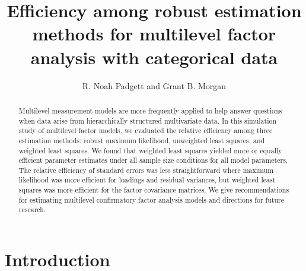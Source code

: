 \documentclass[Review,sageh,times, doublespace]{sagej}
\begin{document}

\title{Efficiency among robust estimation methods for multilevel factor analysis with categorical data}

\author{R. Noah Padgett and Grant B. Morgan}




\begin{abstract}
Multilevel measurement models are more frequently applied to help answer questions when data arise from hierarchically structured multivariate data. 
In this simulation study of multilevel factor models, we evaluated the relative efficiency among three estimation methods: robust maximum likelihood, unweighted least squares, and weighted least squares.
We found that weighted least squares yielded more or equally efficient parameter estimates under all sample size conditions for all model parameters.
The relative efficiency of standard errors was less straightforward where maximum likelihood was more efficient for loadings and residual variances, but weighted least squares was more efficient for the factor covariance matrices.
We give recommendations for estimating multilevel confirmatory factor analysis models and directions for future research.
\end{abstract}


\maketitle

\section{Introduction}
\setlength{\abovedisplayskip}{3pt}
\setlength{\belowdisplayskip}{3pt}
\end{document}
